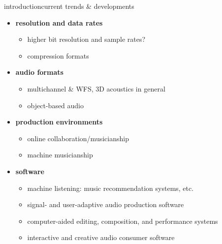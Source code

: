 \begin{frame}{introduction}{current trends \& developments}
	\begin{itemize}
		\item	\textbf{resolution and data rates}
			\begin{itemize}
				\item	higher bit resolution and sample rates?
				\item	compression formats
			\end{itemize}
		\pause
		\item	\textbf{audio formats}
			\begin{itemize}
				\item	multichannel \& WFS, 3D acoustics in general
                \item   object-based audio
			\end{itemize}
		\pause
		\item	\textbf{production environments}
			\begin{itemize}
				\item	online collaboration/musicianship
                \item   machine musicianship
			\end{itemize}
		\pause
		\item	\textbf{software}
			\begin{itemize}
				\item	machine listening:  music recommendation systems, etc.
				\item	signal- and user-adaptive audio production software
				\item	computer-aided editing, composition, and performance systems
                \item   interactive and creative audio consumer software
			\end{itemize}
	\end{itemize}
\end{frame}

